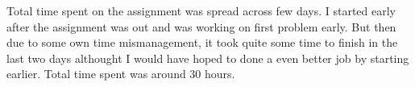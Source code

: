 \documentclass[11pt]{article}
\begin{document}
Total time spent on the assignment was spread across few days. I started early after the assignment was out and was working on first problem early. But then due to some own time mismanagement, it took quite some time to finish in the last two days althought I would have hoped to done a even better job by starting earlier. Total time spent was around 30 hours.
	
\end{document}
